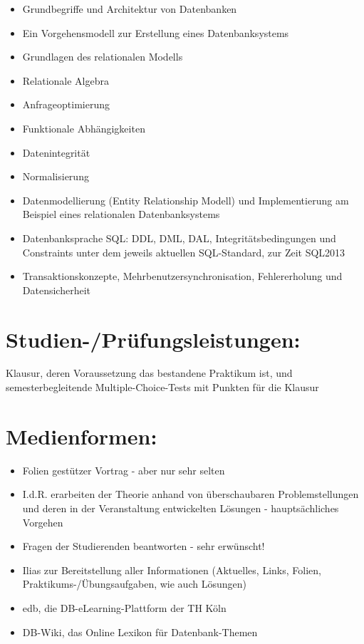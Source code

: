 \begin{itemize}
\item
  Grundbegriffe und Architektur von Datenbanken
\item
  Ein Vorgehensmodell zur Erstellung eines Datenbanksystems
\item
  Grundlagen des relationalen Modells
\item
  Relationale Algebra
\item
  Anfrageoptimierung
\item
  Funktionale Abhängigkeiten
\item
  Datenintegrität
\item
  Normalisierung
\item
  Datenmodellierung (Entity Relationship Modell) und Implementierung am
  Beispiel eines relationalen Datenbanksystems
\item
  Datenbanksprache SQL: DDL, DML, DAL, Integritätsbedingungen und
  Constraints unter dem jeweils aktuellen SQL-Standard, zur Zeit SQL2013
\item
  Transaktionskonzepte, Mehrbenutzersynchronisation, Fehlererholung und
  Datensicherheit
\end{itemize}

\section*{Studien-/Prüfungsleistungen:}\label{studien-pruxfcfungsleistungen-6}

Klausur, deren Voraussetzung das bestandene Praktikum ist, und
semesterbegleitende Multiple-Choice-Tests mit Punkten für die Klausur

\section*{Medienformen:}\label{medienformen-4}

\begin{itemize}
\item
  Folien gestützer Vortrag - aber nur sehr selten
\item
  I.d.R. erarbeiten der Theorie anhand von überschaubaren
  Problemstellungen und deren in der Veranstaltung entwickelten Lösungen
  - hauptsächliches Vorgehen
\item
  Fragen der Studierenden beantworten - sehr erwünscht!
\item
  Ilias zur Bereitstellung aller Informationen (Aktuelles, Links,
  Folien, Praktikums-/Übungsaufgaben, wie auch Lösungen)
\item
  edb, die DB-eLearning-Plattform der TH Köln
\item
  DB-Wiki, das Online Lexikon für Datenbank-Themen
\end{itemize}

